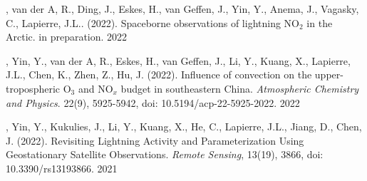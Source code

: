 

\begin{cvhonors}

\publication
{, van der A, R., Ding, J., Eskes, H., van Geffen, J.,
Yin, Y., Anema, J., Vagasky, C., Lapierre, J.L.. (2022).
Spaceborne observations of lightning NO$_2$ in the Arctic. in preparation.} %
{2022} %

\publication
{, Yin, Y., van der A, R., Eskes, H., van Geffen, J.,
Li, Y., Kuang, X., Lapierre, J.L., Chen, K., Zhen, Z., Hu, J. (2022).
Influence of convection on the upper-tropospheric O$_3$ and NO$_x$ budget in southeastern China.
\emph{Atmospheric Chemistry and Physics}.
22(9), 5925-5942, doi: 10.5194/acp-22-5925-2022.} %
{2022} %

\publication
{, Yin, Y., Kukulies, J., Li, Y., Kuang, X.,
He, C., Lapierre, J.L., Jiang, D., Chen, J. (2022).
Revisiting Lightning Activity and Parameterization Using
Geostationary Satellite Observations.
\emph{Remote Sensing}, 13(19), 3866,
doi: 10.3390/rs13193866.} %
{2021} %

\end{cvhonors}

